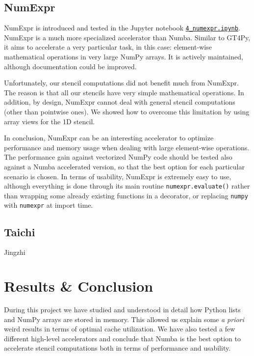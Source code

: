 \documentclass[12pt]{article}
\begin{document}
\subsection{NumExpr}

NumExpr is introduced and tested in the Jupyter notebook \href{run:./4_numexpr.ipynb}{\texttt{4\_numexpr.ipynb}}. NumExpr is a much more specialized accelerator than Numba. Similar to GT4Py, it aims to accelerate a very particular task, in this case: element-wise mathematical operations in very large NumPy arrays. It is actively maintained, although documentation could be improved.

Unfortunately, our stencil computations did not benefit much from NumExpr. The reason is that all our stencils have very simple mathematical operations. In addition, by design, NumExpr cannot deal with general stencil computations (other than pointwise ones). We showed how to overcome this limitation by using array views for the 1D stencil.

In conclusion, NumExpr can be an interesting accelerator to optimize performance and memory usage when dealing with large element-wise operations. The performance gain against vectorized NumPy code should be tested also against a Numba accelerated version, so that the best option for each particular scenario is chosen. In terms of usability, NumExpr is extremely easy to use, although everything is done through its main routine \texttt{numexpr.evaluate()} rather than wrapping some already existing functions in a decorator, or replacing \texttt{numpy} with \texttt{numexpr} at import time.


\subsection{Taichi}

{\color{red}Jingzhi}

\section{Results \& Conclusion}

During this project we have studied and understood in detail how Python lists and NumPy arrays are stored in memory. This allowed us explain some \emph{a priori} weird results in terms of optimal cache utilization. We have also tested a few different high-level accelerators and conclude that Numba is the best option to accelerate stencil computations both in terms of performance and usability.
\end{document}
